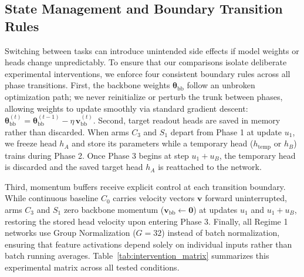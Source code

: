 \documentclass[10pt]{article}
\begin{document}
\subsection{State Management and Boundary Transition Rules}\label{subsec:schedule_transitions}

Switching between tasks can introduce unintended side effects if model weights or heads change unpredictably. To ensure that our comparisons isolate deliberate experimental interventions, we enforce four consistent boundary rules across all phase transitions. First, the backbone weights $\bm{\theta}_{\mathrm{bb}}$ follow an unbroken optimization path; we never reinitialize or perturb the trunk between phases, allowing weights to update smoothly via standard gradient descent: $\bm{\theta}_{\mathrm{bb}}^{(t)} = \bm{\theta}_{\mathrm{bb}}^{(t-1)} - \eta \, \bm{v}_{\mathrm{bb}}^{(t)}$. Second, target readout heads are saved in memory rather than discarded. When arms $C_3$ and $S_1$ depart from Phase 1 at update $u_1$, we freeze head $h_A$ and store its parameters while a temporary head ($h_{\mathrm{temp}}$ or $h_B$) trains during Phase 2. Once Phase 3 begins at step $u_1 + u_B$, the temporary head is discarded and the saved target head $h_A$ is reattached to the network.

Third, momentum buffers receive explicit control at each transition boundary. While continuous baseline $C_0$ carries velocity vectors $\bm{v}$ forward uninterrupted, arms $C_3$ and $S_1$ zero backbone momentum ($\bm{v}_{\mathrm{bb}} \leftarrow \mathbf{0}$) at updates $u_1$ and $u_1 + u_B$, restoring the stored head velocity upon entering Phase 3. Finally, all Regime 1 networks use Group Normalization ($G = 32$) \cite{wu2018groupnorm} instead of batch normalization, ensuring that feature activations depend solely on individual inputs rather than batch running averages. Table~\ref{tab:intervention_matrix} summarizes this experimental matrix across all tested conditions.
\end{document}
